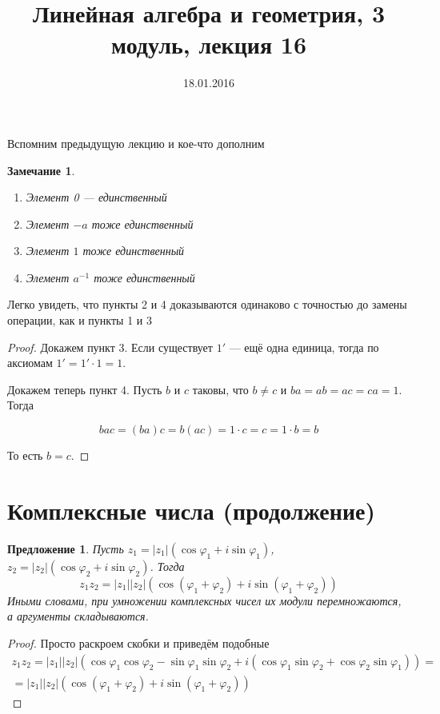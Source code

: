 \documentclass[a4paper,12pt]{article}
\author{}
\title{Линейная алгебра и геометрия, 3 модуль, лекция 16}
\date{18.01.2016}
\newtheorem*{Suggestion}{Предложение}
\newtheorem*{Comment}{Замечание}
\begin{document}
\maketitle
Вспомним предыдущую лекцию и кое-что дополним
\begin{Comment}
\ 
\begin{enumerate}
    \item Элемент 0 --- единственный 
    \item Элемент $-a$ тоже единственный
    \item Элемент $1$ тоже единственный
    \item Элемент $a^{-1}$ тоже единственный
\end{enumerate}
\end{Comment}
Легко увидеть, что пункты 2 и 4 доказываются одинаково с точностью до замены операции, как и пункты 1 и 3

\begin{proof}
Докажем пункт 3. Если существует $1'$ --- ещё одна единица, тогда по аксиомам $1'=1'\cdot1=1$.

Докажем теперь пункт 4. Пусть $b$ и $c$ таковы, что $b \neq c$ и $ba = ab = ac = ca = 1$. Тогда 

\[
bac = \left(ba\right)c = b\left(ac\right) = 1\cdot c = c = 1 \cdot b = b
\]

То есть $b = c$.
\end{proof}

\section*{Комплексные числа (продолжение)}

\begin{Suggestion}
Пусть $z_1 = |z_1|\left(\cos{\varphi_1}+i\sin{\varphi_1}\right)$, $z_2 = |z_2|\left(\cos{\varphi_2} + i\sin{\varphi_2}\right)$. Тогда 
\[
z_1z_2 = |z_1||z_2|\left(\cos\left(\varphi_1 + \varphi_2\right) + i\sin\left(\varphi_1 + \varphi_2\right)\right)
\]
Иными словами, при умножении комплексных чисел их модули перемножаются, а аргументы складываются.
\end{Suggestion}

\begin{proof}
Просто раскроем скобки и приведём подобные
\begin{gather*}
z_1z_2 = |z_1||z_2|\left(\cos\varphi_1\cos\varphi_2-\sin\varphi_1\sin\varphi_2 + i\left(\cos\varphi_1\sin\varphi_2+\cos\varphi_2\sin\varphi_1\right)\right) = \\ =|z_1||z_2|\left(\cos\left(\varphi_1 + \varphi_2\right) + i\sin\left(\varphi_1 + \varphi_2\right)\right)
\end{gather*}
\end{proof}
\end{document}
